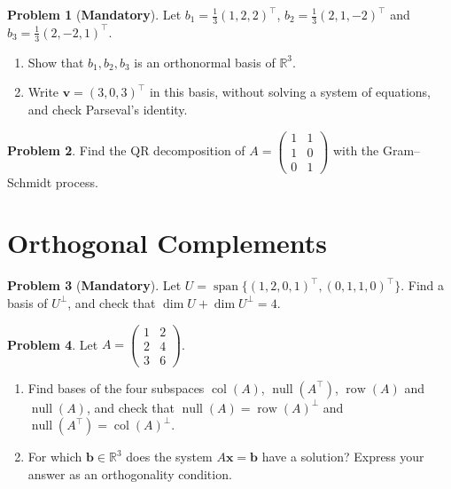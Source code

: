 \documentclass[11pt]{article}
\theoremstyle{definition}
\newtheorem{problem}{Problem}[section]
\newcommand{\mandatory}{\textcolor{red!70!black}{\textbf{Mandatory}}}
\DeclareMathOperator{\Null}{null}
\DeclareMathOperator{\col}{col}
\DeclareMathOperator{\row}{row}
\DeclareMathOperator{\Span}{span}
\begin{document}
\begin{problem}[\mandatory]\label{pr:onb-coords}
    Let $b_1 = \frac{1}{3}(1, 2, 2)^\top$, $b_2 = \frac{1}{3}(2, 1, -2)^\top$ and $b_3 = \frac{1}{3}(2, -2, 1)^\top$.
    \begin{enumerate}[label=(\alph*)]
        \item Show that $b_1, b_2, b_3$ is an orthonormal basis of $\mathbb{R}^3$.
        \item Write $\mathbf{v} = (3, 0, 3)^\top$ in this basis, without solving a system of equations, and check Parseval's identity.
    \end{enumerate}
\end{problem}

\begin{problem}\label{pr:qr}
    Find the QR decomposition of $A = \begin{pmatrix} 1 & 1 \\ 1 & 0 \\ 0 & 1 \end{pmatrix}$ with the Gram--Schmidt process.
\end{problem}

\section{Orthogonal Complements}

\begin{problem}[\mandatory]\label{pr:complement}
    Let $U = \Span\{(1, 2, 0, 1)^\top, (0, 1, 1, 0)^\top\}$. Find a basis of $U^\perp$, and check that $\dim U + \dim U^\perp = 4$.
\end{problem}

\begin{problem}\label{pr:four-subspaces}
    Let $A = \begin{pmatrix} 1 & 2 \\ 2 & 4 \\ 3 & 6 \end{pmatrix}$.
    \begin{enumerate}[label=(\alph*)]
        \item Find bases of the four subspaces $\col(A)$, $\Null(A^\top)$, $\row(A)$ and $\Null(A)$, and check that $\Null(A) = \row(A)^\perp$ and $\Null(A^\top) = \col(A)^\perp$.
        \item For which $\mathbf{b} \in \mathbb{R}^3$ does the system $A\mathbf{x} = \mathbf{b}$ have a solution? Express your answer as an orthogonality condition.
    \end{enumerate}
\end{problem}
\end{document}
